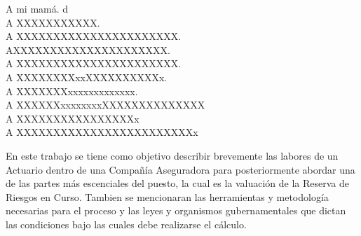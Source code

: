 \documentclass[11pt,twoside,openright,spanish]{report}
\numberwithin{equation}{chapter}
\numberwithin{figure}{chapter}
\numberwithin{table}{chapter}
\begin{document}
	\newpage
	$\ $
	\thispagestyle{empty} %
	
	\begin{acknowledgements}
	 
	A mi mamá. d
	\\

	A XXXXXXXXXXX.
	\\
	
	A XXXXXXXXXXXXXXXXXXXXXX.
	\\
	
	AXXXXXXXXXXXXXXXXXXXXX.
	\\
	
	A XXXXXXXXXXXXXXXXXXXXXX.
	\\
	
	A XXXXXXXXxxXXXXXXXXXXx.
	\\
	
	A XXXXXXXxxxxxxxxxxxxx.   
	\\
	
	A XXXXXXxxxxxxxxXXXXXXXXXXXXXX
	\\
	
	A XXXXXXXXXXXXXXXXx
	\\
	
	A XXXXXXXXXXXXXXXXXXXXXXXXx
	\\
	
		
	\end{acknowledgements}
	
	
	\tableofcontents
	
	
	\addtolength{\headheight}{\baselineskip}
	\pagestyle{fancy}
	\cleardoublepage
		
	\begin{preface}
	\doublespacing
	
	En este trabajo se tiene como objetivo describir brevemente las labores de un Actuario dentro de una Compañía Aseguradora para posteriormente abordar una de las partes más escenciales del puesto, la cual es la valuación de la Reserva de Riesgos en Curso. Tambien se mencionaran las herramientas y metodología necesarias para el proceso y las leyes y organismos gubernamentales que dictan las condiciones bajo las cuales debe realizarse el cálculo.
		
	\end{preface}
	
\end{document}
